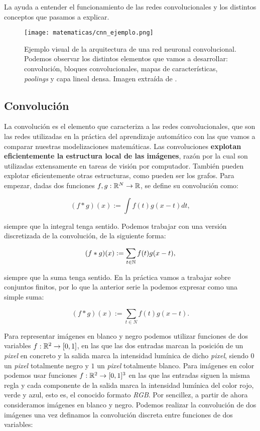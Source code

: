 La  ayuda a entender el funcionamiento de las redes convolucionales y los distintos conceptos que pasamos a explicar.

\begin{figure}[!hbtp]
    \centering
    \texttt{[image: matematicas/cnn\_ejemplo.png]}
    \caption{Ejemplo visual de la arquitectura de una red neuronal convolucional. Podemos observar los distintos elementos que vamos a desarrollar: convolución, bloques convolucionales, mapas de características, \textit{poolings} y capa lineal densa. Imagen extraída de \cite{matematicas:ejemplo_cnn}.}
    \label{img:ejemplo_cnn}
\end{figure}

\subsection{Convolución}

La convolución es el elemento que caracteriza a las redes convolucionales, que son las redes utilizadas en la práctica del aprendizaje automático con las que vamos a comparar nuestras modelizaciones matemáticas. Las convoluciones \textbf{explotan eficientemente la estructura local de las imágenes}, razón por la cual son utilizadas extensamente en tareas de visión por computador. También pueden explotar eficientemente otras estructuras, como pueden ser los grafos. Para empezar, dadas dos funciones $f, g: \mathbb{R}^N \to \mathbb{R}$, se define su convolución como:

\begin{equation}
    (f * g)(x) := \int f(t) g(x - t) dt,
\end{equation}

siempre que la integral tenga sentido. Podemos trabajar con una versión discretizada de la convolución, de la siguiente forma:

\begin{equation}
    (f * g)(x) := \sum_{t \in \mathbb{N}} f(t) g(x - t),
\end{equation}

siempre que la suma tenga sentido. En la práctica vamos a trabajar sobre conjuntos finitos, por lo que la anterior serie la podemos expresar como una simple suma:

\begin{equation}
    (f * g)(x) := \sum_{t \in N} f(t) g(x - t).
\end{equation}

Para representar imágenes en blanco y negro podemos utilizar funciones de dos variables $f: \mathbb{R}^2 \to [0, 1]$, en las que las dos entradas marcan la posición de un \textit{pixel} en concreto y la salida marca la intensidad lumínica de dicho \textit{pixel}, siendo $0$ un \textit{pixel} totalmente negro y $1$ un \textit{pixel} totalmente blanco. Para imágenes en color podemos usar funciones $f: \mathbb{R}^2 \to [0,1]^3$ en las que las entradas siguen la misma regla y cada componente de la salida marca la intensidad lumínica del color rojo, verde y azul, esto es, el conocido formato \textit{RGB}. Por sencillez, a partir de ahora consideramos imágenes en blanco y negro. Podemos realizar la convolución de dos imágenes una vez definamos la convolución discreta entre funciones de dos variables:

